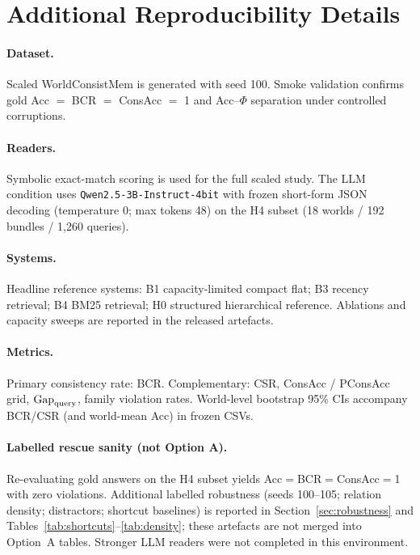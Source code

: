 \section{Additional Reproducibility Details}
\label{app:repro}

\paragraph{Dataset.} Scaled WorldConsistMem is generated with seed 100. Smoke validation confirms gold Acc $=$ BCR $=$ ConsAcc $=$ 1 and Acc--$\Phi$ separation under controlled corruptions.

\paragraph{Readers.} Symbolic exact-match scoring is used for the full scaled study. The LLM condition uses \texttt{Qwen2.5-3B-Instruct-4bit} with frozen short-form JSON decoding (temperature 0; max tokens 48) on the H4 subset (18 worlds / 192 bundles / 1{,}260 queries).

\paragraph{Systems.} Headline reference systems: B1 capacity-limited compact flat; B3 recency retrieval; B4 BM25 retrieval; H0 structured hierarchical reference. Ablations and capacity sweeps are reported in the released artefacts.

\paragraph{Metrics.} Primary consistency rate: BCR. Complementary: CSR, ConsAcc / PConsAcc grid, $\mathrm{Gap}_{\mathrm{query}}$, family violation rates. World-level bootstrap 95\% CIs accompany BCR/CSR (and world-mean Acc) in frozen CSVs.

\paragraph{Labelled rescue sanity (not Option A).} Re-evaluating gold answers on the H4 subset yields Acc$=$BCR$=$ConsAcc$=$1 with zero violations. Additional labelled robustness (seeds 100--105; relation density; distractors; shortcut baselines) is reported in Section~\ref{sec:robustness} and Tables~\ref{tab:shortcuts}--\ref{tab:density}; these artefacts are not merged into Option~A tables. Stronger LLM readers were not completed in this environment.

